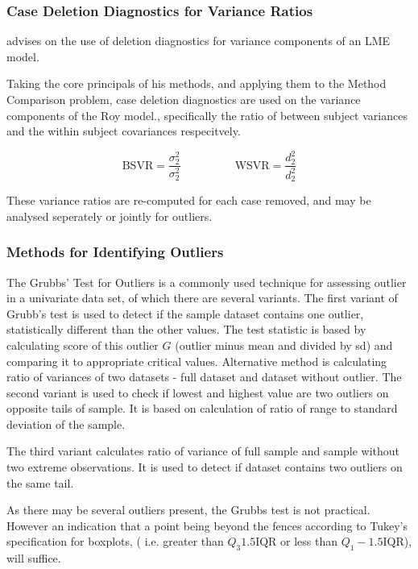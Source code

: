 \documentclass[12pt, a4paper]{report}
\theoremstyle{plain}
\theoremstyle{definition}
\theoremstyle{remark}
\begin{document}
	
	
	
	
	
	
	
	
	\subsubsection{Case Deletion Diagnostics for Variance Ratios}
	
	\citet{schabenberger} advises on the use of deletion diagnostics for variance components of an LME model.
	
	Taking the core principals of his methods, and applying them to the Method Comparison problem, case deletion diagnostics are used on the variance components of the Roy model., specifically the ratio of between subject variances and the within subject covariances respecitvely.
	
	
	\[ \mbox{BSVR} = \frac{\sigma^2_2}{\sigma^2_2} \phantom{makespace}  \mbox{WSVR} = \frac{d^2_2}{d^2_2} \]
	
	These variance ratios are re-computed for each case removed, and may be analysed seperately or jointly for outliers.
	
	
	
	
	\subsubsection{Methods for Identifying Outliers}
	The Grubbs' Test for Outliers is a commonly used technique for assessing outlier in a univariate data set, of which there are several variants. The first variant of Grubb's test is used to detect if the sample dataset contains one outlier, statistically different than
	the other values. The test statistic is based by calculating score of this outlier $G$ (outlier minus mean and divided
	by sd) and comparing it to appropriate critical values. Alternative method is calculating ratio of
	variances of two datasets - full dataset and dataset without outlier.
	The second variant is used to check if lowest and highest value are two outliers on opposite tails of sample. It is based on calculation of ratio of range to standard deviation of the sample.
	
	The third variant calculates ratio of variance of full sample and sample without two extreme observations.
	It is used to detect if dataset contains two outliers on the same tail.
	
	As there may be several outliers present, the Grubbs test is not practical. However an indication that a point being beyond the fences according to Tukey's
	specification for boxplots, ( i.e. greater than $Q_3 1.5 \mbox{IQR}$ or less than $Q_1 - 1.5 \mbox{IQR}$), will suffice.
	
\end{document}
